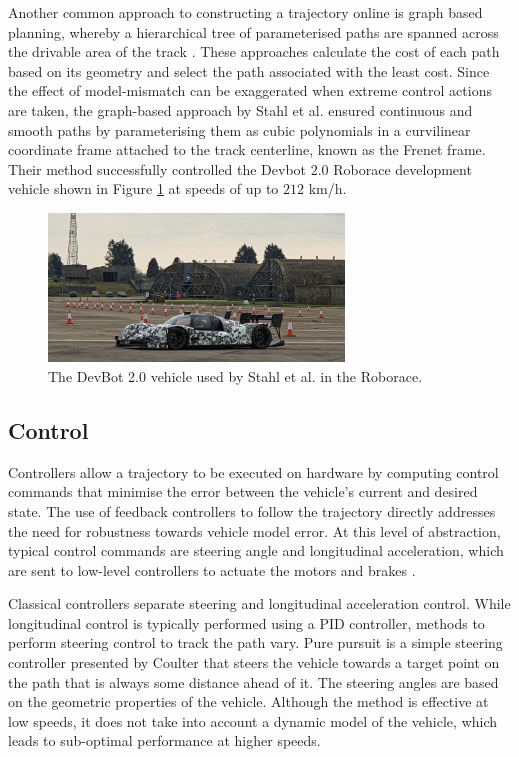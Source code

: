 Another common approach to constructing a trajectory online is graph based planning, whereby a hierarchical tree of parameterised paths are spanned across the drivable area of the track \cite{Stahl2019, Werling2010, Li2017}.
These approaches calculate the cost of each path based on its geometry and select the path associated with the least cost.
Since the effect of model-mismatch can be exaggerated when extreme control actions are taken, the graph-based approach by Stahl et al. \cite{Stahl2019} ensured continuous and smooth paths by parameterising them as cubic polynomials in a curvilinear coordinate frame attached to the track centerline, known as the Frenet frame.
Their method successfully controlled the Devbot $2.0$ Roborace development vehicle shown in Figure \ref{fig:Devbot2} at speeds of up to $212$ km/h.

\begin{figure}[htb!]
    \centering
    \includegraphics[width=0.7\textwidth]{contents/chapt2/figs/devbot.PNG}
    \caption[The DevBot 2.0 Roborace vehicle]{The DevBot 2.0 vehicle used by Stahl et al. \cite{Stahl2019} in the Roborace. }
    \label{fig:Devbot2}
\end{figure}


\subsection{Control}\label{sec:control}

Controllers allow a trajectory to be executed on hardware by computing control commands that minimise the error between the vehicle's current and desired state.
The use of feedback controllers to follow the trajectory directly addresses the need for robustness towards vehicle model error.
At this level of abstraction, typical control commands are steering angle and longitudinal acceleration, which are sent to low-level controllers to actuate the motors and brakes \cite{Betz2021}.

Classical controllers separate steering and longitudinal acceleration control. 
While longitudinal control is typically performed using a PID controller, methods to perform steering control to track the path vary.
Pure pursuit is a simple steering controller presented by Coulter \cite{Coulter_1992} that steers the vehicle towards a target point on the path that is always some distance ahead of it.
The steering angles are based on the geometric properties of the vehicle.
Although the method is effective at low speeds, it does not take into account a dynamic model of the vehicle, which leads to sub-optimal performance at higher speeds.

